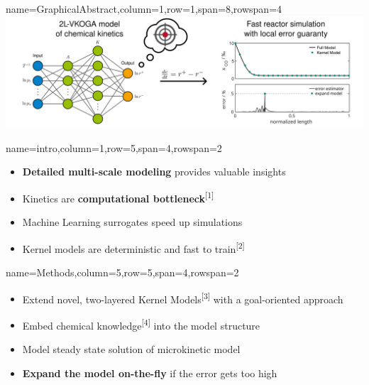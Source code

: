 \documentclass[
	accentcolor=3c,
	boxstyle=colored, %
	colorback=false,
	title=small
	]{tudasciposter}
\begin{document}
\begin{tcbposter}[
	poster={
		columns=8,
		rows=12,
		spacing=1cm,
	},]

\begin{posterboxenv}{name=GraphicalAbstract,column=1,row=1,span=8,rowspan=4}
	\centering
	\includegraphics[width=\textwidth]{abb/GA_draft}
\end{posterboxenv}

\begin{posterboxenv}[title=1. Introduction]{name=intro,column=1,row=5,span=4,rowspan=2}
	\begin{itemize}
		\item \textbf{Detailed multi-scale modeling} provides valuable insights
		\item Kinetics are \textbf{computational bottleneck}\textsuperscript{[1]}
		\item Machine Learning surrogates speed up simulations
		\item Kernel models are deterministic and fast to train\textsuperscript{[2]}
	\end{itemize}
\end{posterboxenv}

\begin{posterboxenv}[title=2. Methods]{name=Methods,column=5,row=5,span=4,rowspan=2}
	\begin{itemize}
		\item Extend novel, two-layered Kernel Models\textsuperscript{[3]} with a goal-oriented approach
		\item Embed chemical knowledge\textsuperscript{[4]} into the model structure %
		\item Model steady state solution of microkinetic model\textbf{}
		\item \textbf{Expand the model on-the-fly} if the error gets too high
	\end{itemize}
\end{posterboxenv}


\end{tcbposter}
\end{document}
